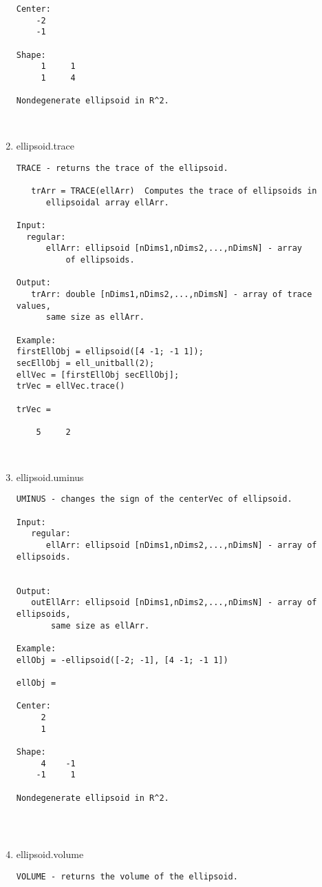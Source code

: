 \begin{enumerate}
\begin{lstlisting}
Center:
    -2
    -1

Shape:
     1     1
     1     4

Nondegenerate ellipsoid in R^2.



\end{lstlisting}
\fontfamily{\familydefault}
\selectfont
\item {ellipsoid.trace}
\selectfont
\begin{lstlisting}
TRACE - returns the trace of the ellipsoid.

   trArr = TRACE(ellArr)  Computes the trace of ellipsoids in
      ellipsoidal array ellArr.

Input:
  regular:
      ellArr: ellipsoid [nDims1,nDims2,...,nDimsN] - array
          of ellipsoids.

Output:
   trArr: double [nDims1,nDims2,...,nDimsN] - array of trace values,
      same size as ellArr.

Example:
firstEllObj = ellipsoid([4 -1; -1 1]);
secEllObj = ell_unitball(2);
ellVec = [firstEllObj secEllObj];
trVec = ellVec.trace()

trVec =

    5     2



\end{lstlisting}
\fontfamily{\familydefault}
\selectfont
\item {ellipsoid.uminus}
\selectfont
\begin{lstlisting}
UMINUS - changes the sign of the centerVec of ellipsoid.

Input:
   regular:
      ellArr: ellipsoid [nDims1,nDims2,...,nDimsN] - array of ellipsoids.


Output:
   outEllArr: ellipsoid [nDims1,nDims2,...,nDimsN] - array of ellipsoids,
       same size as ellArr.

Example:
ellObj = -ellipsoid([-2; -1], [4 -1; -1 1])

ellObj =

Center:
     2
     1

Shape:
     4    -1
    -1     1

Nondegenerate ellipsoid in R^2.




\end{lstlisting}
\fontfamily{\familydefault}
\selectfont
\item {ellipsoid.volume}
\selectfont
\begin{lstlisting}
VOLUME - returns the volume of the ellipsoid.


\end{lstlisting}
\end{enumerate}
